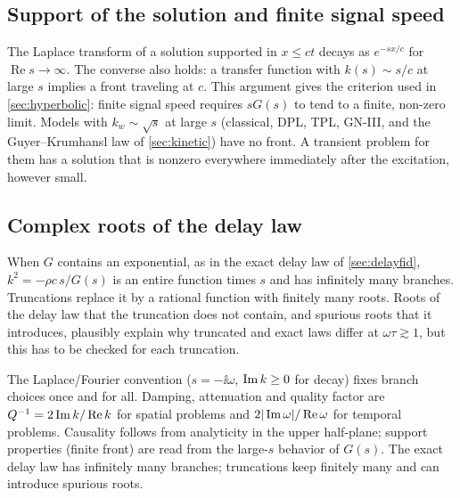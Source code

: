\subsection{Support of the solution and finite signal speed}
The Laplace transform of a solution supported in $x\le ct$ decays as $e^{-sx/c}$ for $\operatorname{Re}s\to\infty$. The converse also holds: a transfer function with $k(s)\sim s/c$ at large $s$ implies a front traveling at $c$. This argument gives the criterion used in \cref{sec:hyperbolic}: finite signal speed requires $sG(s)$ to tend to a finite, non-zero limit. Models with $k_w\sim\sqrt{s}$ at large $s$ (classical, DPL, TPL, GN-III, and the Guyer--Krumhansl law of \cref{sec:kinetic}) have no front. A transient problem for them has a solution that is nonzero everywhere immediately after the excitation, however small.

\subsection{Complex roots of the delay law}
When $G$ contains an exponential, as in the exact delay law of \cref{sec:delayfid}, $k^2=-\rho c\,s/G(s)$ is an entire function times $s$ and has infinitely many branches. Truncations replace it by a rational function with finitely many roots. Roots of the delay law that the truncation does not contain, and spurious roots that it introduces, plausibly explain why truncated and exact laws differ at $\omega\tau\gtrsim1$, but this has to be checked for each truncation.

\begin{summarybox}[Summary]
The Laplace/Fourier convention ($s=-\ii\omega$, $\operatorname{Im} k\ge0$ for decay) fixes branch choices once and for all. Damping, attenuation and quality factor are $Q^{-1}=2\operatorname{Im} k/\operatorname{Re} k$ for spatial problems and $2|\operatorname{Im}\omega|/\operatorname{Re}\omega$ for temporal problems. Causality follows from analyticity in the upper half-plane; support properties (finite front) are read from the large-$s$ behavior of $G(s)$. The exact delay law has infinitely many branches; truncations keep finitely many and can introduce spurious roots.
\end{summarybox}
